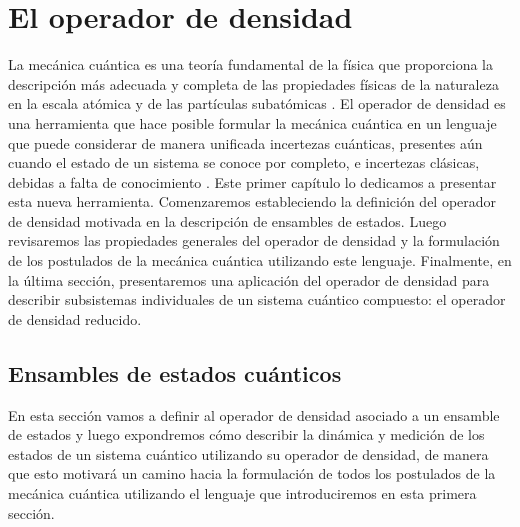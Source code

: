\chapter{El operador de densidad} %
La mecánica cuántica es una teoría fundamental de la física que
proporciona la descripción más adecuada y completa de las propiedades
físicas de la naturaleza en la escala atómica y de las partículas 
subatómicas \cite{feynman1965feyman}. 
El operador de densidad es una herramienta
que hace posible formular la mecánica cuántica en un lenguaje
que puede considerar de manera unificada incertezas cuánticas, 
presentes aún cuando el estado de un sistema se conoce 
por completo, e incertezas clásicas, 
debidas a falta de conocimiento \cite{sakurai_napolitano_2017}.
Este primer capítulo lo dedicamos a presentar esta nueva herramienta.
Comenzaremos estableciendo la definición del operador de densidad
motivada en la descripción de ensambles de estados. Luego
revisaremos las propiedades generales del operador de densidad y la 
formulación de los postulados de la mecánica cuántica utilizando este
lenguaje. Finalmente, en la última sección, presentaremos una aplicación 
del operador de densidad para describir subsistemas individuales 
de un sistema cuántico compuesto: el operador de densidad reducido.



\section{Ensambles de estados cuánticos} %
En esta sección vamos a definir al operador de densidad asociado a 
un ensamble de estados y luego expondremos cómo describir la dinámica
y medición de los estados de un sistema cuántico utilizando 
su operador de densidad, 
de manera que esto motivará un camino hacia la formulación
de todos los postulados de la mecánica cuántica utilizando el
lenguaje que introduciremos en esta primera sección.

